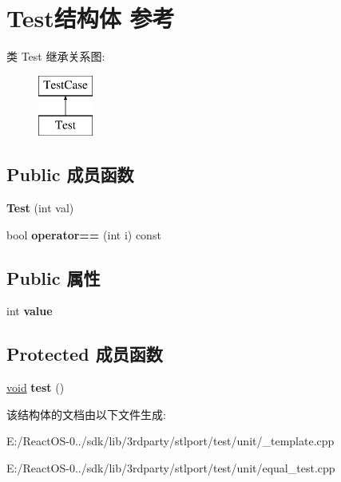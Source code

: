 \hypertarget{class_test}{}\section{Test结构体 参考}
\label{class_test}
类 Test 继承关系图\+:\begin{figure}[H]
\begin{center}
\leavevmode
\includegraphics[height=2.000000cm]{class_test}
\end{center}
\end{figure}
\subsection*{Public 成员函数}
\begin{DoxyCompactItemize}
\item 
\mbox{\label{class_test_a6c072e63c2bd8dd4d2905e99419eb54a}} 
{\bfseries Test} (int val)
\item 
\mbox{\label{class_test_adb0c65b8e7da18c0fdea138426a1ef63}} 
bool {\bfseries operator==} (int i) const
\end{DoxyCompactItemize}
\subsection*{Public 属性}
\begin{DoxyCompactItemize}
\item 
\mbox{\label{class_test_ad55002283eba8ffa062dfb849f6c077c}} 
int {\bfseries value}
\end{DoxyCompactItemize}
\subsection*{Protected 成员函数}
\begin{DoxyCompactItemize}
\item 
\mbox{\label{class_test_a9fc54b716f326514a4c5f434137f4fc0}} 
\hyperlink{interfacevoid}{void} {\bfseries test} ()
\end{DoxyCompactItemize}


该结构体的文档由以下文件生成\+:\begin{DoxyCompactItemize}
\item 
E\+:/\+React\+O\+S-\/0../sdk/lib/3rdparty/stlport/test/unit/\+\_\+template.\+cpp\item 
E\+:/\+React\+O\+S-\/0../sdk/lib/3rdparty/stlport/test/unit/equal\+\_\+test.\+cpp\end{DoxyCompactItemize}
